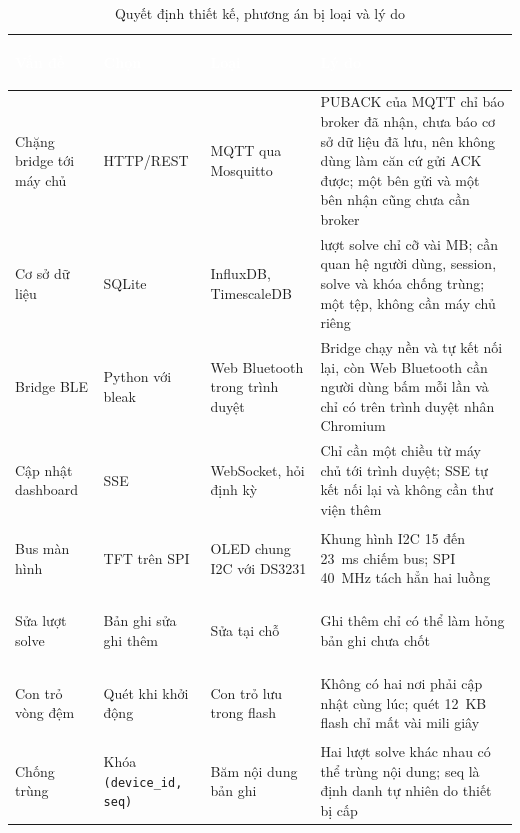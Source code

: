 \begin{table}[H]
    \centering
    \small
    \renewcommand{\arraystretch}{1.35}
    \caption{Quyết định thiết kế, phương án bị loại và lý do}
    \label{tab:decisions}
    \begin{tabular}{>{\bfseries\raggedright\arraybackslash}m{2.4cm} >{\raggedright\arraybackslash}m{2.9cm} >{\raggedright\arraybackslash}m{2.9cm} >{\raggedright\arraybackslash}m{5.6cm}}
        \toprule
        \rowcolor{haitayblue}
        \textcolor{white}{Vấn đề} & \textcolor{white}{Chọn} & \textcolor{white}{Loại} & \textcolor{white}{Lý do} \\
        \midrule
        \rowcolor{haitayblue!8}
        Chặng bridge tới máy chủ & HTTP/REST & MQTT qua Mosquitto & PUBACK của MQTT chỉ báo broker đã nhận, chưa báo cơ sở dữ liệu đã lưu, nên không dùng làm căn cứ gửi ACK được; một bên gửi và một bên nhận cũng chưa cần broker \\
        Cơ sở dữ liệu & SQLite & InfluxDB, TimescaleDB & 100.000 lượt solve chỉ cỡ vài MB; cần quan hệ người dùng, session, solve và khóa chống trùng; một tệp, không cần máy chủ riêng \\
        \rowcolor{haitayblue!8}
        Bridge BLE & Python với bleak & Web Bluetooth trong trình duyệt & Bridge chạy nền và tự kết nối lại, còn Web Bluetooth cần người dùng bấm mỗi lần và chỉ có trên trình duyệt nhân Chromium \\
        Cập nhật dashboard & SSE & WebSocket, hỏi định kỳ & Chỉ cần một chiều từ máy chủ tới trình duyệt; SSE tự kết nối lại và không cần thư viện thêm \\
        \rowcolor{haitayblue!8}
        Bus màn hình & TFT trên SPI & OLED chung I2C với DS3231 & Khung hình I2C 15 đến 23~ms chiếm bus; SPI 40~MHz tách hẳn hai luồng \\
        Sửa lượt solve & Bản ghi sửa ghi thêm & Sửa tại chỗ & Ghi thêm chỉ có thể làm hỏng bản ghi chưa chốt \\
        \rowcolor{haitayblue!8}
        Con trỏ vòng đệm & Quét khi khởi động & Con trỏ lưu trong flash & Không có hai nơi phải cập nhật cùng lúc; quét 12~KB flash chỉ mất vài mili giây \\
        Chống trùng & Khóa \texttt{(device\_id, seq)} & Băm nội dung bản ghi & Hai lượt solve khác nhau có thể trùng nội dung; seq là định danh tự nhiên do thiết bị cấp \\
        \bottomrule
    \end{tabular}
\end{table}
